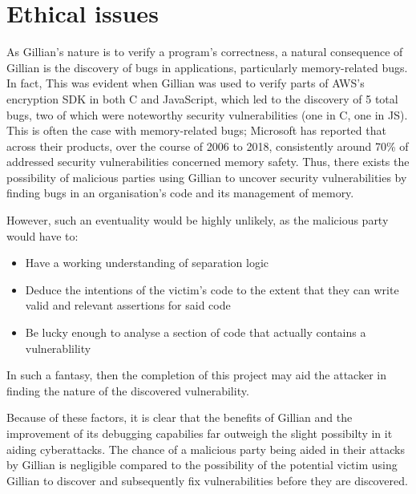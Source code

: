 \chapter{Ethical issues}

As Gillian's nature is to verify a program's correctness, a natural consequence of Gillian is the discovery of bugs in applications, particularly memory-related bugs.
In fact,
This was evident when Gillian was used to verify parts of AWS's encryption SDK in both C and JavaScript, which led to the discovery of 5 total bugs, two of which were noteworthy security vulnerabilities (one in C, one in JS)\cite{gillian-part2}.
This is often the case with memory-related bugs; Microsoft has reported that across their products, over the course of 2006 to 2018, consistently around 70\% of addressed security vulnerabilities concerned memory safety\cite{microsoft-memory-bugs}.
Thus, there exists the possibility of malicious parties using Gillian to uncover security vulnerabilities by finding bugs in an organisation's code and its management of memory.

However, such an eventuality would be highly unlikely, as the malicious party would have to:
\begin{itemize}
  \item Have a working understanding of separation logic
  \item Deduce the intentions of the victim's code to the extent that they can write valid and relevant assertions for said code
  \item Be lucky enough to analyse a section of code that actually contains a vulnerablility
\end{itemize}

In such a fantasy, then the completion of this project may aid the attacker in finding the nature of the discovered vulnerability.

Because of these factors, it is clear that the benefits of Gillian and the improvement of its debugging capabilies far outweigh the slight possibilty in it aiding cyberattacks.
The chance of a malicious party being aided in their attacks by Gillian is negligible compared to the possibility of the potential victim using Gillian to discover and subsequently fix vulnerabilities before they are discovered.
